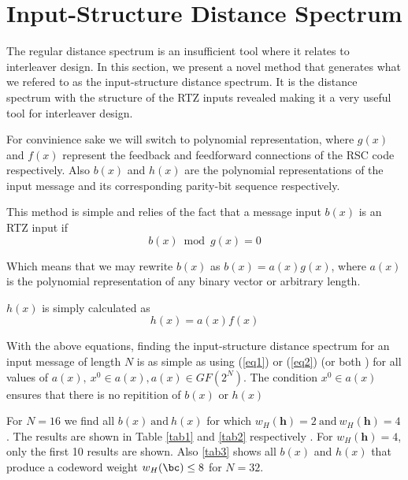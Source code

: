 \section{Input-Structure Distance Spectrum }
\label{sec4}
The regular distance spectrum is an insufficient tool where it relates to interleaver design. In this section, we present a novel method that generates what we refered to as the input-structure distance spectrum. It is the distance spectrum with the structure of the RTZ inputs revealed making it a very useful tool for interleaver design.

For convinience sake we will switch to polynomial representation, where $g(x)$ and $f(x)$ represent the feedback and feedforward connections of the RSC code respectively. Also $b(x)$ and $h(x)$ are the polynomial representations of the input message and its corresponding parity-bit sequence respectively.

This method is simple and relies of the fact that a message input $b(x)$ is an RTZ input if 
\begin{equation}
b(x) \bmod g(x) =0
\label{eq1}
\end{equation}

Which means that we may rewrite $b(x)$ as $b(x)=a(x)g(x)$, where $a(x)$ is the polynomial representation of any binary vector or arbitrary length.

$h(x)$ is simply calculated as 
\begin{equation}
h(x) =a(x)f(x)
\label{eq2}
\end{equation}

With the above equations, finding the input-structure distance spectrum for an input message of length $N$ is as simple as using (\ref{eq1}) or  (\ref{eq2}) (or both ) for all values of $a(x),~x^0\in a(x), a(x) \in GF(2^N)$. The condition $x^0\in a(x)$ ensures that there is no repitition of $b(x)$ or $h(x)$

 For $N=16$ we find all $b(x) ~\text{and}~ h(x)$ for which $w_H(\textbf{h})=2 ~\text{and} ~ w_H(\textbf{h})=4$. The results are shown in Table \ref{tab1} and \ref{tab2} respectively . For $w_H(\textbf{h})=4$, only the first 10 results are shown.
 Also \ref{tab3} shows all $b(x)$ and $h(x)$ that produce a codeword weight $w_H(\bc) \leq 8$ for $N=32$.


